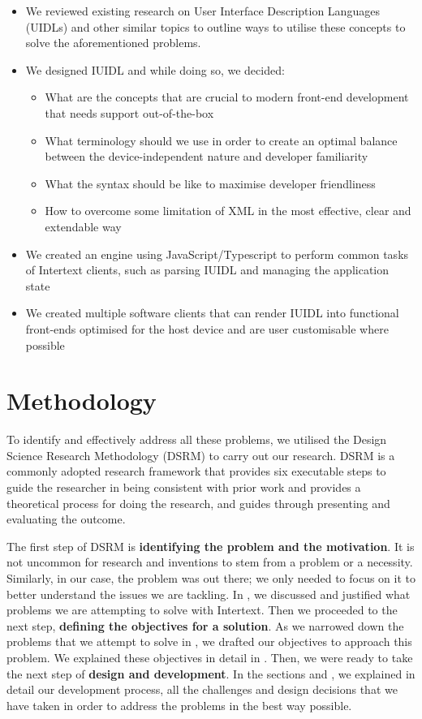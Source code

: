 \begin{itemize}
  \item We reviewed existing research on User Interface Description Languages (UIDLs) and other similar topics to outline ways to utilise these concepts to solve the aforementioned problems.
  \item We designed IUIDL and while doing so, we decided:
  \begin{itemize}
    \item What are the concepts that are crucial to modern front-end development that needs support out-of-the-box
    \item What terminology should we use in order to create an optimal balance between the device-independent nature and developer familiarity
    \item What the syntax should be like to maximise developer friendliness
    \item How to overcome some limitation of XML in the most effective, clear and extendable way
  \end{itemize}
  \item We created an engine using JavaScript/Typescript to perform common tasks of Intertext clients, such as parsing IUIDL and managing the application state
  \item We created multiple software clients that can render IUIDL into functional front-ends optimised for the host device and are user customisable where possible
\end{itemize}


\section{Methodology} \label{methodology}

To identify and effectively address all these problems, we utilised the Design Science Research Methodology (DSRM) \cite{DSRM} to carry out our research. DSRM is a commonly adopted research framework that provides six executable steps to guide the researcher in being consistent with prior work and provides a theoretical process for doing the research, and guides through presenting and evaluating the outcome. 

The first step of DSRM is \textbf{identifying the problem and the motivation}. It is not uncommon for research and inventions to stem from a problem or a necessity. Similarly, in our case, the problem was out there; we only needed to focus on it to better understand the issues we are tackling. In , we discussed and justified what problems we are attempting to solve with Intertext. Then we proceeded to the next step, \textbf{defining the objectives for a solution}. As we narrowed down the problems that we attempt to solve in , we drafted our objectives to approach this problem. We explained these objectives in detail in . Then, we were ready to take the next step of \textbf{design and development}. In the sections  and , we explained in detail our development process, all the challenges and design decisions that we have taken in order to address the problems in the best way possible. 

